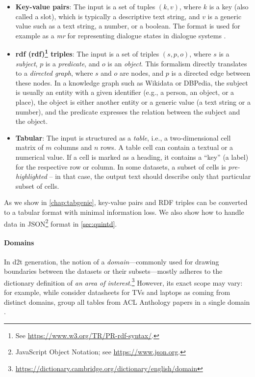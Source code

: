 {\begin{itemize}
    \item \textbf{Key-value pairs}: The input is a set of tuples $(k, v)$, where $k$ is a key (also called a slot), which is typically a descriptive text string, and $v$ is a generic value such as a text string, a number, or a boolean. The format is used for example as a \emph{\ac{mr}} for representing dialogue states in dialogue systems \cite{rastogiScalableMultiDomainConversational2020,budzianowskiMultiWOZLargeScaleMultiDomain2020}.
    \item \textbf{\acs{rdf} (\Acl{rdf})\footnote{See \url{https://www.w3.org/TR/PR-rdf-syntax/}.} triples}: The input is a set of triples $(s, p, o)$, where $s$ is a \emph{subject},  $p$ is a \emph{predicate}, and $o$ is an \textit{object}. This formalism directly translates to a \emph{directed graph}, where $s$ and $o$ are nodes, and $p$ is a directed edge between these nodes. In a knowledge graph such as Wikidata or DBPedia, the subject is usually an entity with a given identifier (e.g., a person, an object, or a place), the object is either another entity or a generic value (a text string or a number), and the predicate expresses the relation between the subject and the object.
    \item \textbf{Tabular}: The input is structured as a \textit{table}, i.e., a two-dimensional cell matrix of $m$ columns and $n$ rows. A table cell can contain a textual or a numerical value. If a cell is marked as a heading, it contains a ``key'' (a label) for the respective row or column. In some datasets, a subset of cells is \emph{pre-highlighted} -- in that case, the output text should describe only that particular subset of cells.
\end{itemize}



As we show in \autoref{chap:tabgenie}, key-value pairs and RDF triples can be converted to a tabular format with minimal information loss. We also show how to handle data in JSON\footnote{JavaScript Object Notation; see \url{https://www.json.org}.} format in \autoref{sec:quintd}.


\paragraph{Domains} In \ac{d2t} generation, the notion of a \emph{domain}---commonly used for drawing boundaries between the datasets or their subsets---mostly adheres to the dictionary definition of \emph{an area of interest}.\footnote{\url{https://dictionary.cambridge.org/dictionary/english/domain}} However, its exact scope may vary: for example, while \citet{wen2016multi} consider datasheets for TVs and laptops as coming from distinct domains, \citet{lin2023survey} group all tables from ACL Anthology papers in a single domain \cite{suadaaTabletoTextGenerationNumerical2021}.

}
